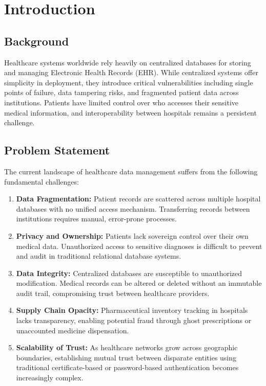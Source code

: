 \chapter{Introduction}

\section{Background}
Healthcare systems worldwide rely heavily on centralized databases for storing and managing Electronic Health Records (EHR). While centralized systems offer simplicity in deployment, they introduce critical vulnerabilities including single points of failure, data tampering risks, and fragmented patient data across institutions. Patients have limited control over who accesses their sensitive medical information, and interoperability between hospitals remains a persistent challenge.

\section{Problem Statement}

The current landscape of healthcare data management suffers from the following fundamental challenges:

\begin{enumerate}
    \item \textbf{Data Fragmentation:} Patient records are scattered across multiple hospital databases with no unified access mechanism. Transferring records between institutions requires manual, error-prone processes.
    
    \item \textbf{Privacy and Ownership:} Patients lack sovereign control over their own medical data. Unauthorized access to sensitive diagnoses is difficult to prevent and audit in traditional relational database systems.
    
    \item \textbf{Data Integrity:} Centralized databases are susceptible to unauthorized modification. Medical records can be altered or deleted without an immutable audit trail, compromising trust between healthcare providers.
    
    \item \textbf{Supply Chain Opacity:} Pharmaceutical inventory tracking in hospitals lacks transparency, enabling potential fraud through ghost prescriptions or unaccounted medicine dispensation.
    
    \item \textbf{Scalability of Trust:} As healthcare networks grow across geographic boundaries, establishing mutual trust between disparate entities using traditional certificate-based or password-based authentication becomes increasingly complex.
\end{enumerate}


